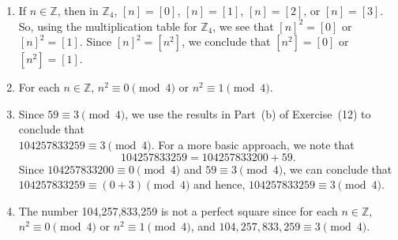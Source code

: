 \documentclass[11pt]{article}
\begin{document}
\begin{enumerate}
\item If  $n \in \mathbb{Z}$, then in  $\mathbb{Z}_4 $, $\left[ n \right] = \left[ 0 \right]$,
$\left[ n \right] = \left[ 1 \right]$, $\left[ n \right] = \left[ 2 \right]$, or 
$\left[ n \right] = \left[ 3 \right]$.  So, using the multiplication table for  $\mathbb{Z}_4 $, we see that  $\left[ n \right]^2  = \left[ 0 \right]$  or  
$\left[ n \right]^2  = \left[ 1 \right]$.  Since  $\left[ n \right]^2  = \left[ {n^2 } \right]$, we conclude that  $\left[ {n^2 } \right] = \left[ 0 \right]$  or  
$\left[ {n^2 } \right] = \left[ 1 \right]$.

\item For each  $n \in \mathbb{Z}$,  $n^2  \equiv 0 \pmod 4$  or  $n^2  \equiv 1 \pmod 4$.

\item Since  $59 \equiv 3 \pmod 4$, we use the results in Part~(b) of Exercise~(12) to conclude that  \\
$104 257 833 259 \equiv 3 \pmod 4$.  For a more basic approach, we note that
\[
104 257 833 259 = 104 257 833 200 + 59.
\]
Since $104 257 833 200 \equiv 0 \pmod 4$ and $59 \equiv 3 \pmod 4$, we can conclude that
$104 257 833 259 \equiv (0 + 3) \pmod 4$ and hence, $104 257 833 259 \equiv 3 \pmod 4$.

\item The number  104,257,833,259 is not a perfect square since for each  $n \in \mathbb{Z}$,  
$n^2  \equiv 0 \pmod 4$  or  $n^2  \equiv 1 \pmod 4$, and  
$104,257,833,259 \equiv 3 \pmod 4$.
\end{enumerate}
\end{document}
